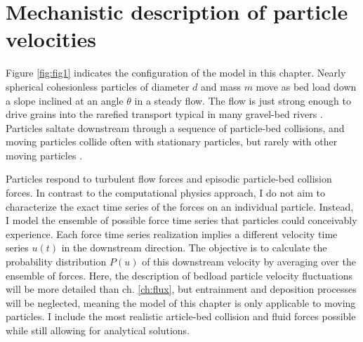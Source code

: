 \section{Mechanistic description of particle velocities}
\label{sec:langmodel}

Figure \ref{fig:fig1} indicates the configuration of the model in this chapter.
Nearly spherical cohesionless particles of diameter $d$ and mass $m$ move as bed load down a slope inclined at an angle $\theta$ in a steady flow.
The flow is just strong enough to drive grains into the rarefied transport typical in many gravel-bed rivers \citep[e.g.][]{Jackson1982, Warburton1992,Hassan2001}. Particles saltate downstream through a sequence of particle-bed collisions, and moving particles collide often with stationary particles, but rarely with other moving particles \citep[cf.][]{Williams2020}.

Particles respond to turbulent flow forces and episodic particle-bed collision forces. In contrast to the computational physics approach, I do not aim to characterize the exact time series of the forces on an individual particle. Instead, I model the ensemble of possible force time series that particles could conceivably experience. Each force time series realization implies a different velocity time series $u(t)$ in the downstream direction.
The objective is to calculate the probability distribution $P(u)$ of this downstream velocity by averaging over the ensemble of forces.
Here, the description of bedload particle velocity fluctuations will be more detailed than ch. \ref{ch:flux}, but entrainment and deposition processes will be neglected, meaning the model of this chapter is only applicable to moving particles.
I include the most realistic article-bed collision and fluid forces possible while still allowing for analytical solutions.

